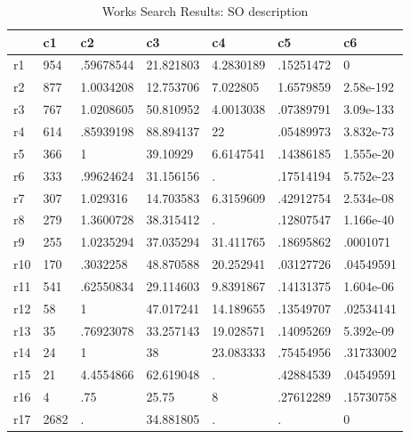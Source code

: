 \begin{table}[htbp]
\caption{\label{taba4} Works Search Results: SO description}\centering\medskip
\begin{tabular}{|l|l|l|l|l|l|l|}\hline  
 & c1  & c2  & c3  & c4  & c5  & c6  \\ \hline  
r1 & 954 & .59678544 & 21.821803 & 4.2830189 & .15251472 & 0 \\ \hline 
r2 & 877 & 1.0034208 & 12.753706 & 7.022805 & 1.6579859 & 2.58e-192 \\ \hline 
r3 & 767 & 1.0208605 & 50.810952 & 4.0013038 & .07389791 & 3.09e-133 \\ \hline 
r4 & 614 & .85939198 & 88.894137 & 22 & .05489973 & 3.832e-73 \\ \hline 
r5 & 366 & 1 & 39.10929 & 6.6147541 & .14386185 & 1.555e-20 \\ \hline 
r6 & 333 & .99624624 & 31.156156 & . & .17514194 & 5.752e-23 \\ \hline 
r7 & 307 & 1.029316 & 14.703583 & 6.3159609 & .42912754 & 2.534e-08 \\ \hline 
r8 & 279 & 1.3600728 & 38.315412 & . & .12807547 & 1.166e-40 \\ \hline 
r9 & 255 & 1.0235294 & 37.035294 & 31.411765 & .18695862 & .0001071 \\ \hline 
r10 & 170 & .3032258 & 48.870588 & 20.252941 & .03127726 & .04549591 \\ \hline 
r11 & 541 & .62550834 & 29.114603 & 9.8391867 & .14131375 & 1.604e-06 \\ \hline 
r12 & 58 & 1 & 47.017241 & 14.189655 & .13549707 & .02534141 \\ \hline 
r13 & 35 & .76923078 & 33.257143 & 19.028571 & .14095269 & 5.392e-09 \\ \hline 
r14 & 24 & 1 & 38 & 23.083333 & .75454956 & .31733002 \\ \hline 
r15 & 21 & 4.4554866 & 62.619048 & . & .42884539 & .04549591 \\ \hline 
r16 & 4 & .75 & 25.75 & 8 & .27612289 & .15730758 \\ \hline 
r17 & 2682 & . & 34.881805 & . & . & 0 \\ \hline 
  \end{tabular}
\end{table}
